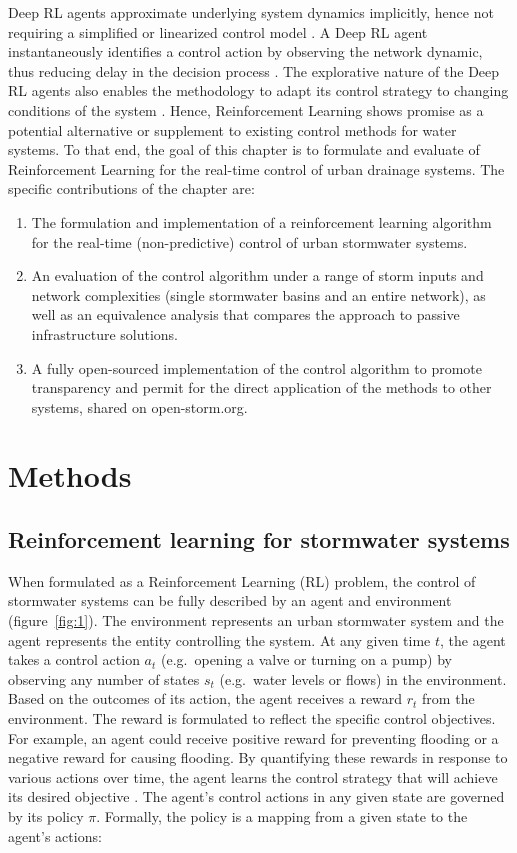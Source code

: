Deep RL agents approximate underlying system dynamics implicitly, hence not requiring a simplified or linearized control model \cite{Sutton98}.
A Deep RL agent instantaneously identifies a control action by observing the network dynamic, thus reducing delay in the decision process \cite{Mnih2015, Silver2017MasteringAlgorithm}.
The explorative nature of the Deep RL agents also enables the methodology to adapt its control strategy to changing conditions of the system \cite{Sutton98}.
Hence, Reinforcement Learning shows promise as a potential alternative or supplement to existing control methods for water systems.
To that end, the goal of this chapter is to formulate and evaluate of Reinforcement Learning for the real-time control of urban drainage systems.
The specific contributions of the chapter are:
\begin{enumerate}
    \item The formulation and implementation of a reinforcement learning algorithm for the real-time (non-predictive) control of urban stormwater systems.
    \item An evaluation of the control algorithm under a range of storm inputs and network complexities (single stormwater basins and an entire network), as well as an equivalence analysis that compares the approach to passive infrastructure solutions.
    \item A fully open-sourced implementation of the control algorithm to promote transparency and permit for the direct application of the methods to other systems, shared on open-storm.org.
\end{enumerate}

\section{Methods}
\subsection{Reinforcement learning for stormwater systems}
When formulated as a Reinforcement Learning (RL) problem, the control of stormwater systems can be fully described by an agent and environment (figure~\ref{fig:1}).
The environment represents an urban stormwater system and the agent represents the entity controlling the system.
At any given time $t$, the agent takes a control action $a_t$ (e.g.\ opening a valve or turning on a pump) by observing any number of states $s_t$ (e.g.\ water levels or flows) in the environment.
Based on the outcomes of its action, the agent receives a reward $r_t$ from the environment.
The reward is formulated to reflect the specific control objectives.
For example, an agent could receive positive reward for preventing flooding or a negative reward for causing flooding.
By quantifying these rewards in response to various actions over time, the agent learns the control strategy that will achieve its desired objective \cite{Sutton98}.
The agent's control actions in any given state are governed by its policy $\pi$. Formally, the policy is a mapping from a given state to the agent’s actions:

